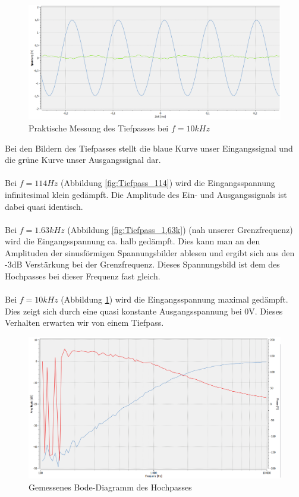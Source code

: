 \newpage
\begin{figure}[htb]
    \includegraphics[width=13cm]{./pictures/Messungen/Tiefpass_10k}
    \caption{Praktische Messung des Tiefpasses bei $f=10kHz$}
    \label{fig:Tiefpass_10k}
\end{figure}

Bei den Bildern des Tiefpasses stellt die blaue Kurve unser Eingangssignal und die grüne Kurve unser Ausgangssignal dar.
\\
\\
Bei $f=114Hz$ (Abbildung \ref{fig:Tiefpass_114}) wird die Eingangsspannung infinitesimal klein gedämpft.  Die Amplitude des Ein- und Ausgangssignals ist dabei quasi identisch.
\\
\\
Bei $f=1.63kHz$ (Abbildung \ref{fig:Tiefpass_1,63k}) (nah unserer Grenzfrequenz) wird die Eingangsspannung ca. halb gedämpft. Dies kann man an den Amplituden der sinusförmigen Spannungsbilder ablesen und ergibt sich aus den -3dB Verstärkung bei der Grenzfrequenz. Dieses Spannungsbild ist dem des Hochpasses bei dieser Frequenz fast gleich.
\\
\\
Bei $f=10kHz$ (Abbildung \ref{fig:Tiefpass_10k}) wird die Eingangsspannung maximal gedämpft. Dies zeigt sich durch eine quasi konstante Ausgangsspannung bei 0V. Dieses Verhalten erwarten wir von einem Tiefpass.

\begin{figure}[htb]
    \includegraphics[width=13cm]{./pictures/Messungen/Hochpass_Bode_Test}
    \caption{Gemessenes Bode-Diagramm des Hochpasses}
    \label{fig:Hochpass_Bode_Test}
\end{figure}

